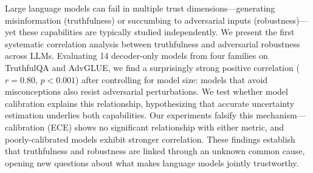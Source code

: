 Large language models can fail in multiple trust dimensions---generating misinformation (truthfulness) or succumbing to adversarial inputs (robustness)---yet these capabilities are typically studied independently. We present the first systematic correlation analysis between truthfulness and adversarial robustness across LLMs. Evaluating 14 decoder-only models from four families on TruthfulQA and AdvGLUE, we find a surprisingly strong positive correlation ($r=0.80$, $p<0.001$) after controlling for model size: models that avoid misconceptions also resist adversarial perturbations. We test whether model calibration explains this relationship, hypothesizing that accurate uncertainty estimation underlies both capabilities. Our experiments falsify this mechanism---calibration (ECE) shows no significant relationship with either metric, and poorly-calibrated models exhibit stronger correlation. These findings establish that truthfulness and robustness are linked through an unknown common cause, opening new questions about what makes language models jointly trustworthy.
